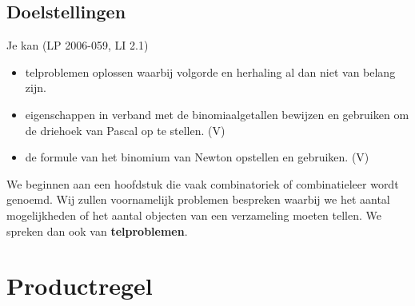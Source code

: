 \documentclass[12pt,twoside]{article}
\begin{document}
\begin{theorie}
\subsection*{Doelstellingen}
{\singlespacing
Je kan \hfill  {\scriptsize(LP 2006-059, LI 2.1)}
\begin{itemize}
  \itemsep0em
  \item telproblemen oplossen waarbij volgorde en herhaling al dan niet van belang zijn.
  \item eigenschappen in verband met de binomiaalgetallen bewijzen en gebruiken om de driehoek van Pascal op
te stellen. (V)
  \item de formule van het binomium van Newton opstellen en gebruiken. (V)
\end{itemize}}

\pagestyle{empty}
\mbox{}
\newpage
\clearpage
\thispagestyle{empty}
{\scriptsize\tableofcontents}
\newpage
\clearpage
\pagestyle{fancy}

\fancyhead[RE,LO]{}

We beginnen aan een hoofdstuk die vaak combinatoriek of combinatieleer wordt genoemd. Wij zullen voornamelijk problemen bespreken waarbij we het aantal mogelijkheden of het aantal objecten van een verzameling moeten tellen. We spreken dan ook van {\bf telproblemen}.

\end{theorie}

\section{Productregel}
\end{document}
